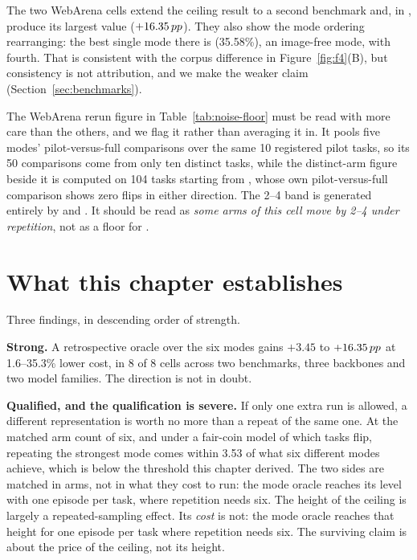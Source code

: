 The two WebArena cells extend the ceiling result to a second benchmark and, in
, produce its largest value ($+16.35\,pp$). They also
show the mode ordering rearranging: the best single mode there is \mPT{}
(35.58\%), an image-free mode, with \mSoM{} fourth. That is consistent with the
corpus difference in Figure~\ref{fig:f4}(B), but consistency is not attribution, and we make the weaker claim
(Section~\ref{sec:benchmarks}).

The WebArena rerun figure in Table~\ref{tab:noise-floor} must be read with more
care than the others, and we flag it rather than averaging it in. It pools
five modes' pilot-versus-full comparisons over the same 10 registered pilot
tasks, so its 50 comparisons come from only ten distinct tasks, while the distinct-arm figure
beside it is computed on 104 tasks starting from \mDOM{}, whose own pilot-versus-full comparison shows zero flips in either direction. The 2--4\pp{}
band is generated entirely by \mVis{} and \mPP{}. It should be read as
\emph{some arms of this cell move by 2--4\pp{} under repetition}, not as a floor
for \mDOM{}.

\FloatBarrier
\section{What this chapter establishes}
\label{sec:ch4-summary}

Three findings, in descending order of strength.

\textbf{Strong.} A retrospective oracle over the six modes gains
$+3.45$ to $+16.35\,pp$ at 1.6--35.3\% lower cost, in 8 of 8 cells across two
benchmarks, three backbones and two model families. The direction is not in
doubt.

\textbf{Qualified, and the qualification is severe.} If only one extra run is
allowed, a different representation is worth no more than a repeat of the same
one. At the matched arm count of six, and under a fair-coin model of which
tasks flip, repeating the strongest mode comes
within 3.53\pp{} of what six different modes achieve, which is below the
threshold this chapter derived. The two sides are matched in arms, not in what
they cost to run: the mode oracle reaches its level with one episode per task,
where repetition needs six. The height of
the ceiling is largely a repeated-sampling effect. Its \emph{cost} is not: the
mode oracle reaches that height for one episode per task where repetition needs
six. The surviving claim is about the price of the ceiling, not its height.

